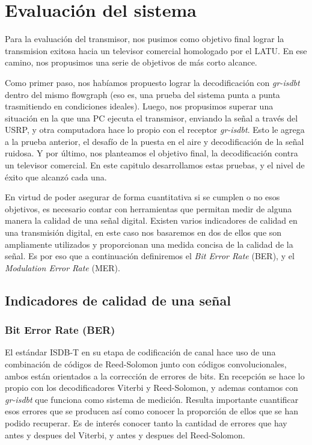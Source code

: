 \chapter{Evaluación del sistema}

Para la evaluación del transmisor, nos pusimos como objetivo final lograr la transmision exitosa hacia un televisor comercial homologado por el LATU. En ese camino, nos propusimos una serie de objetivos de más corto alcance. 

Como primer paso, nos habíamos propuesto lograr la decodificación con \textit{gr-isdbt} dentro del mismo flowgraph (eso es, una prueba del sistema punta a punta trasmitiendo en condiciones ideales). Luego, nos propusimos superar una situación en la que una PC ejecuta el transmisor, enviando la señal a través del USRP, y otra computadora hace lo propio con el receptor \textit{gr-isdbt}. Esto le agrega a la prueba anterior, el desafío de la puesta en el aire y decodificación de la señal ruidosa. Y por último, nos planteamos el objetivo final, la decodificación contra un televisor comercial. En este capitulo desarrollamos estas pruebas, y el nivel de éxito que alcanzó cada una.

En virtud de poder asegurar de forma cuantitativa si se cumplen o no esos objetivos, es necesario contar con herramientas que permitan medir de alguna manera la calidad de una señal digital. Existen varios indicadores de calidad en una transmisión digital, en este caso nos basaremos en dos de ellos que son ampliamente utilizados y proporcionan una medida concisa de la calidad de la señal. Es por eso que a continuación definiremos el \textit{Bit Error Rate} (BER), y el \textit{Modulation Error Rate} (MER).

\section{Indicadores de calidad de una señal}
\subsection{Bit Error Rate (BER)}
El estándar ISDB-T en su etapa de codificación de canal hace uso de una combinación de códigos de Reed-Solomon junto con códigos convolucionales, ambos están orientados a la corrección de errores de bits. En recepción se hace lo propio con los decodificadores Viterbi y Reed-Solomon, y ademas contamos con \textit{gr-isdbt} que funciona como sistema de medición. Resulta importante cuantificar esos errores que se producen así como conocer la proporción de ellos que se han podido recuperar. Es de interés conocer tanto la cantidad de errores que hay antes y despues del Viterbi, y antes y despues del Reed-Solomon.

